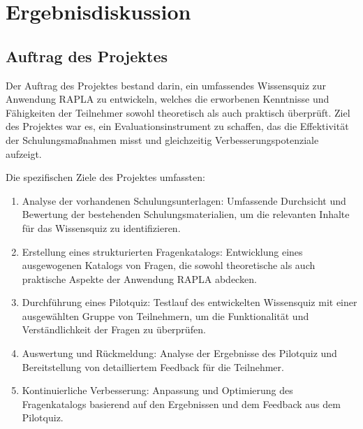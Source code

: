 \chapter{Ergebnisdiskussion}
\section{Auftrag des Projektes}
Der Auftrag des Projektes bestand darin, ein umfassendes Wissensquiz zur Anwendung RAPLA zu entwickeln, welches die erworbenen Kenntnisse und Fähigkeiten der Teilnehmer sowohl theoretisch als auch praktisch überprüft. Ziel des Projektes war es, ein Evaluationsinstrument zu schaffen, das die Effektivität der Schulungsmaßnahmen misst und gleichzeitig Verbesserungspotenziale aufzeigt.

Die spezifischen Ziele des Projektes umfassten:
\begin{enumerate}
    \item Analyse der vorhandenen Schulungsunterlagen: Umfassende Durchsicht und Bewertung der bestehenden Schulungsmaterialien, um die relevanten Inhalte für das Wissensquiz zu identifizieren.
    \item Erstellung eines strukturierten Fragenkatalogs: Entwicklung eines ausgewogenen Katalogs von Fragen, die sowohl theoretische als auch praktische Aspekte der Anwendung RAPLA abdecken.
    \item Durchführung eines Pilotquiz: Testlauf des entwickelten Wissensquiz mit einer ausgewählten Gruppe von Teilnehmern, um die Funktionalität und Verständlichkeit der Fragen zu überprüfen.
    \item Auswertung und Rückmeldung: Analyse der Ergebnisse des Pilotquiz und Bereitstellung von detailliertem Feedback für die Teilnehmer.
    \item Kontinuierliche Verbesserung: Anpassung und Optimierung des Fragenkatalogs basierend auf den Ergebnissen und dem Feedback aus dem Pilotquiz.
\end{enumerate}
